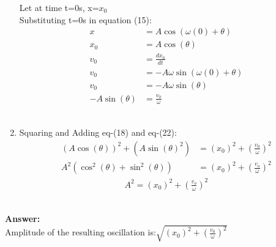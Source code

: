 \documentclass[journal,12pt,twocolumn]{IEEEtran}
\theoremstyle{remark}
\begin{document}
\begin{enumerate}
Let at time t=0s, x=$x_0$\\
Substituting t=0s in equation (15):
\begin{align}
x&=A\cos(\omega{(0)}+\theta{})\\
x_0&=A\cos(\theta{})\\
v_0&=\frac{dx_0}{dt}\\
v_0&=-A\omega{}\sin(\omega{(0)}+\theta{})\\
v_0&=-A\omega{}\sin(\theta{})\\
-A\sin(\theta{})&=\frac{v_0}{\omega{}}
\end{align}\\
\item{}
Squaring and Adding eq-(18) and eq-(22):\\
\begin{align}
(A\cos(\theta{}))^2+(A\sin(\theta{})^2)
&=(x_0)^2+\left(\frac{v_0}{\omega{}}\right)^2\\
A^2(\cos^2(\theta{})+\sin^2(\theta{}))
&=(x_0)^2+\left(\frac{v_o}{\omega{}}\right)^2\end{align}
\begin{align}
A^2=(x_0)^2+(\frac{v_o}{\omega{}})^2
\end{align}
\end{enumerate}\\
\textbf{Answer:}\\
Amplitude of the resulting oscillation is:$\sqrt{(x_0)^2+(\frac{v_0}{\omega{}})^2}$
\end{document}
